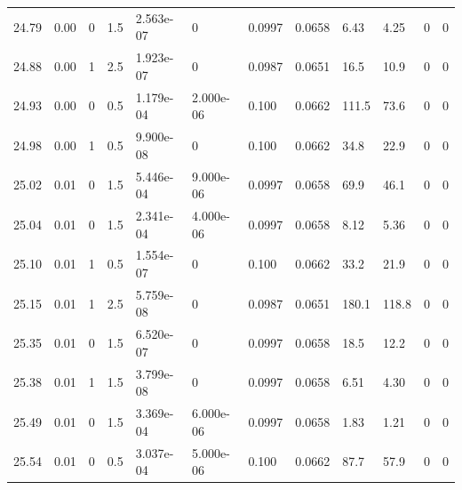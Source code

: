 \documentclass[preview]{standalone}
\begin{document}
{{{{{\begin{tabular}{L{1.2cm}C{1.2cm} C{0.3cm}C{0.5cm} C{1.4cm}C{1.4cm} C{1.4cm}C{1.4cm} C{1.6cm}C{1.6cm} C{1.6cm}C{1.6cm}}
  24.79  &  0.00  & 0     & 1.5 &  2.563e-07  & 0  &  0.0997&   0.0658& 6.43 & 4.25   &  0 & 0  \\ 
  24.88  &  0.00  & 1     & 2.5 &  1.923e-07  & 0  &  0.0987&   0.0651& 16.5 & 10.9   &  0 & 0  \\ 
  24.93  &  0.00  & 0     & 0.5 &  1.179e-04  & 2.000e-06  &  0.100&   0.0662& 111.5 & 73.6   &  0 & 0  \\ 
  24.98  &  0.00  & 1     & 0.5 &  9.900e-08  & 0  &  0.100&   0.0662& 34.8 & 22.9   &  0 & 0  \\ 
  25.02  &  0.01  & 0     & 1.5 &  5.446e-04  & 9.000e-06  &  0.0997&   0.0658& 69.9 & 46.1   &  0 & 0  \\ 
  25.04  &  0.01  & 0     & 1.5 &  2.341e-04  & 4.000e-06  &  0.0997&   0.0658& 8.12 & 5.36   &  0 & 0  \\ 
  25.10  &  0.01  & 1     & 0.5 &  1.554e-07  & 0  &  0.100&   0.0662& 33.2 & 21.9   &  0 & 0  \\ 
  25.15  &  0.01  & 1     & 2.5 &  5.759e-08  & 0  &  0.0987&   0.0651& 180.1 & 118.8   &  0 & 0  \\ 
  25.35  &  0.01  & 0     & 1.5 &  6.520e-07  & 0  &  0.0997&   0.0658& 18.5 & 12.2   &  0 & 0  \\ 
  25.38  &  0.01  & 1     & 1.5 &  3.799e-08  & 0  &  0.0997&   0.0658& 6.51 & 4.30   &  0 & 0  \\ 
  25.49  &  0.01  & 0     & 1.5 &  3.369e-04  & 6.000e-06  &  0.0997&   0.0658& 1.83 & 1.21   &  0 & 0  \\ 
  25.54  &  0.01  & 0     & 0.5 &  3.037e-04  & 5.000e-06  &  0.100&   0.0662& 87.7 & 57.9   &  0 & 0  \\ 
\hline 
\end{tabular} 

}}}}}
\end{document}
